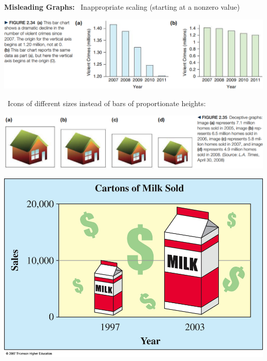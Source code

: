 \documentclass[../mathNotesPreamble]{subfiles}
\begin{document}
  {\noindent\Large\textbf{Misleading Graphs:}}
  \noindent\textbullet\ Inappropriate scaling (starting at a nonzero value)
  \begin{center}
    \includegraphics[width=0.95\linewidth]{images/math211_figure_2p34}
  \end{center}
  \pagebreak
  \noindent\textbullet\ Icons of different sizes instead of bars of proportionate heights:
  \begin{center}
    \includegraphics[width=0.95\linewidth]{images/math211_figure_2p35}
    
    \includegraphics[width=0.65\linewidth]{images/math211_milk_icon}
  \end{center}
  \pagebreak
  
\end{document}

